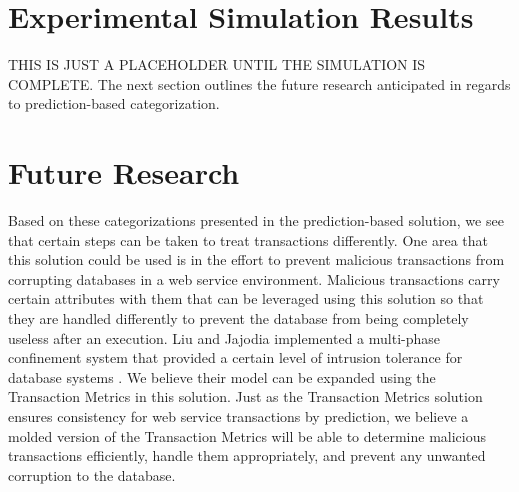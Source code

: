\documentclass[conference]{IEEEtran}
\begin{document}

\section{Experimental Simulation Results}
\label{sec:experimentation}
THIS IS JUST A PLACEHOLDER UNTIL THE SIMULATION IS COMPLETE. The next section outlines the future research anticipated in regards to prediction-based categorization.

\section{Future Research}
\label{sec:future_research}
Based on these categorizations presented in the prediction-based solution, we see that certain steps can be taken to treat transactions differently. One area that this solution could be used is in the effort to prevent malicious transactions from corrupting databases in a web service environment. Malicious transactions carry certain attributes with them that can be leveraged using this solution so that they are handled differently to prevent the database from being completely useless after an execution. Liu and Jajodia implemented a multi-phase confinement system that provided a certain level of intrusion tolerance for database systems \cite{Liu_Intrusion}. We believe their model can be expanded using the Transaction Metrics in this solution. Just as the Transaction Metrics solution ensures consistency for web service transactions by prediction, we believe a molded version of the Transaction Metrics will be able to determine malicious transactions efficiently, handle them appropriately, and prevent any unwanted corruption to the database.


%
\end{document}
